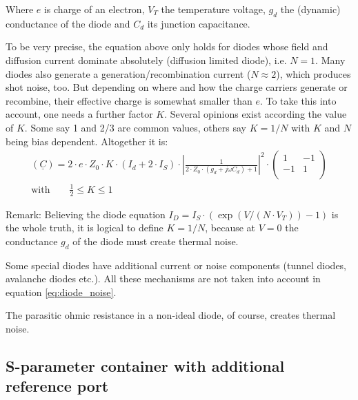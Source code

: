 Where $e$ is charge of an electron, $V_T$ the temperature voltage,
$g_d$ the (dynamic) conductance of the diode and $C_d$ its junction
capacitance.

\addvspace{12pt}

To be very precise, the equation above only holds for diodes whose
field and diffusion current dominate absolutely (diffusion limited
diode), i.e. $N=1$.  Many diodes also generate a
generation/recombination current ($N\approx 2$), which produces shot
noise, too.  But depending on where and how the charge carriers
generate or recombine, their effective charge is somewhat smaller than
$e$.  To take this into account, one needs a further factor $K$.
Several opinions exist according the value of $K$.  Some say 1 and 2/3
are common values, others say $K=1/N$ with $K$ and $N$ being bias
dependent.  Altogether it is:
\begin{equation}
\begin{split}
(\underline{C})
 = 2\cdot e\cdot Z_0\cdot K\cdot \left(I_{d} + 2\cdot I_{S}\right)\cdot
    \left| \frac{1}{2\cdot Z_0\cdot (g_d+j\omega C_d) + 1}\right|^2 \cdot
\begin{pmatrix}
   1 & -1\\
  -1 &  1\\
\end{pmatrix}\\
\text{with}\qquad\frac{1}{2}\le K \le 1
\end{split}
\label{eq:diode_noise}
\end{equation}

Remark: Believing the diode equation $I_D = I_S\cdot (\exp(V/(N\cdot
V_T)) - 1)$ is the whole truth, it is logical to define $K=1/N$,
because at $V=0$ the conductance $g_d$ of the diode must create
thermal noise.

\addvspace{12pt}

Some special diodes have additional current or noise components
(tunnel diodes, avalanche diodes etc.).  All these mechanisms are not
taken into account in equation \eqref{eq:diode_noise}.

\addvspace{12pt}

The parasitic ohmic resistance in a non-ideal diode, of course,
creates thermal noise.

\subsection{S-parameter container with additional reference port}

